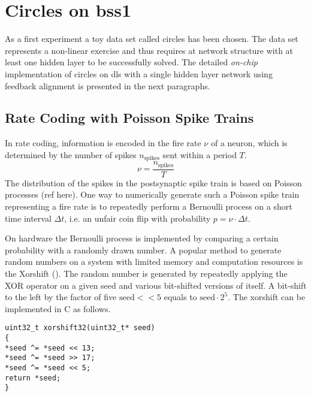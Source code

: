 \section{Circles on \gls{bss1}}
As a first experiment a toy data set called circles has been chosen. The data set represents a non-linear exercise and thus requires at network structure with at least one hidden layer to be successfully solved. The detailed \textit{on-chip} implementation of circles on \gls{dls} with a single hidden layer network using feedback alignment is presented in the next paragraphs.




\subsection{Rate Coding with Poisson Spike Trains}
\label{poissonspiketrains}

In rate coding, information is encoded in the fire rate $\nu$ of a neuron, which is determined by the number of spikes $n_\text{spikes}$ sent within a period $T$. 
\begin{equation}
\nu = \frac{n_\text{spikes}}{T}
\end{equation}
The distribution of the spikes in the postsynaptic spike train is based on Poisson processes (ref here). One way to numerically generate such a Poisson spike train representing a fire rate is to repeatedly perform a Bernoulli process on a short time interval $\Delta t$, i.e. an unfair coin flip with probability $p = \nu \cdot \Delta t$.	

On hardware the Bernoulli process is implemented by comparing a certain probability with a randomly drawn number. A popular method to generate random numbers on a system with limited memory and computation resources is the Xorshift (\cite{marsaglia2003xorshift}). The random number is generated by repeatedly applying the XOR operator on a given seed and various bit-shifted versions of itself. A bit-shift to the left by the factor of five $\text{seed} << 5$ equals to $\text{seed} \cdot 2^5$. The xorshift can be implemented in C as follows.

\begin{verbatim}
uint32_t xorshift32(uint32_t* seed)
{
*seed ^= *seed << 13;
*seed ^= *seed >> 17;
*seed ^= *seed << 5;
return *seed;
}
\end{verbatim}

